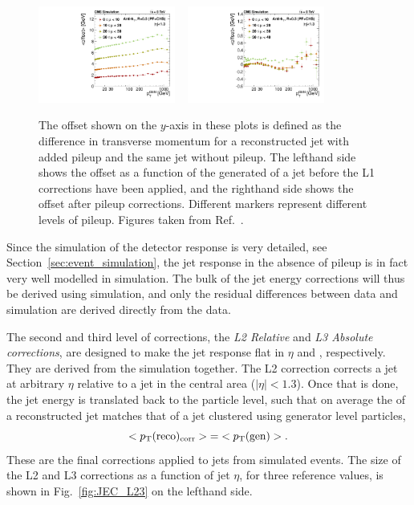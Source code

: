 \begin{figure}[tpb]
  \centering
  \includegraphics[width=0.4\textwidth]{figures/eventreco_objects/OffMeantnpuRef_BB_ak5pfchs}
  ~
  \includegraphics[width=0.4\textwidth]{figures/eventreco_objects/OffMeantnpuRef_BB_ak5pfchsl1}
  \caption{The offset shown on the $y$-axis in these plots is defined as the difference in
transverse momentum for a reconstructed jet with added pileup and the same jet without pileup.
The lefthand side shows the offset as a function of the generated \pt of a jet before the L1
corrections have been applied, and the righthand side shows the offset after pileup
corrections. Different markers represent different levels of pileup. Figures taken from
Ref.~\cite{JEC_plots}.
  \label{fig:JEC_L1}}
\end{figure}

Since the simulation of the detector response is very detailed, see
Section~\ref{sec:event_simulation}, the jet response in the absence of pileup is in fact very well
modelled in simulation. The bulk of the jet energy corrections will thus be derived using
simulation, and only the residual differences between data and simulation are derived directly
from the data.

The second and third level of corrections, the \textit{L2 Relative} and \textit{L3 Absolute
corrections}, are designed to make the jet response flat in $\eta$ and \pt, respectively. They are
derived from the simulation together. The L2 correction corrects a jet at arbitrary $\eta$ relative
to a jet in the central area ($|\eta|<1.3$). Once that is done, the jet energy is translated back to
the particle level, such that on average the \pt of a reconstructed jet matches that of a jet
clustered using generator level particles,
\begin{equation}
  <p_{\mathrm{T}}(\mathrm{reco})_{\mathrm{corr}}> {=} <p_{\mathrm{T}}(\mathrm{gen})> .
\end{equation}
These are the final corrections applied to jets from simulated events. The size of the L2 and L3
corrections as a function of jet $\eta$, for three reference \pt values, is shown in
Fig.~\ref{fig:JEC_L23} on the lefthand side. 

